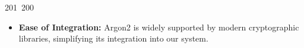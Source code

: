 201~200~\documentclass{article}
\begin{document}
\begin{itemize}
	                                                                                                                                                                                                                                                                                                	                                                                                                                                        	    	                                                                                                	                                                                                                                                                                                                                                                                                                                                	                                                                        	                                                                        	                                                                                    \item \textbf{Ease of Integration:} Argon2 is widely supported by modern cryptographic libraries, simplifying its integration into our system.
	                                                                                                                                                                                                                                                                                                	                                                                                                                                        	    	                                                                                                	                                                                                                                                                                                                                                                                                                                                	                                                                        	                                                                        	                                                                                    \end{itemize}
\end{document}
